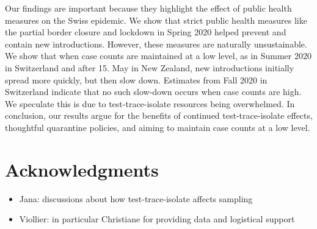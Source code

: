 \documentclass[9pt,twoside,lineno]{pnas-new} %
\begin{document}
Our findings are important because they highlight the effect of public health measures on the Swiss epidemic. We show that strict public health measures like the partial border closure and lockdown in Spring 2020 helped prevent and contain new introductions. However, these measures are naturally unsustainable. We show that when case counts are maintained at a low level, as in Summer 2020 in Switzerland and after 15. May in New Zealand, new introductions initially spread more quickly, but then slow down. Estimates from Fall 2020 in Switzerland indicate that no such slow-down occurs when case counts are high. We speculate this is due to test-trace-isolate resources being overwhelmed. In conclusion, our results argue for the benefits of continued test-trace-isolate effects, thoughtful quarantine policies, and aiming to maintain case counts at a low level.

\section{Acknowledgments}

\begin{itemize}
    \item Jana: discussions about how test-trace-isolate affects sampling
    \item Viollier: in particular Christiane for providing data and logistical support
\end{itemize}




\end{document}
